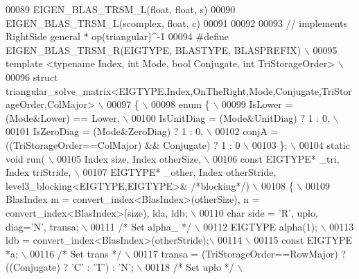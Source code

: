 \begin{DoxyCode}
00089 EIGEN\_BLAS\_TRSM\_L(\textcolor{keywordtype}{float},    \textcolor{keywordtype}{float},  s)
00090 EIGEN\_BLAS\_TRSM\_L(scomplex, \textcolor{keywordtype}{float},  c)
00091 
00092 
00093 \textcolor{comment}{// implements RightSide general * op(triangular)^-1}
00094 \textcolor{preprocessor}{#define EIGEN\_BLAS\_TRSM\_R(EIGTYPE, BLASTYPE, BLASPREFIX) \(\backslash\)}
00095 \textcolor{preprocessor}{template <typename Index, int Mode, bool Conjugate, int TriStorageOrder> \(\backslash\)}
00096 \textcolor{preprocessor}{struct triangular\_solve\_matrix<EIGTYPE,Index,OnTheRight,Mode,Conjugate,TriStorageOrder,ColMajor> \(\backslash\)}
00097 \textcolor{preprocessor}{\{ \(\backslash\)}
00098 \textcolor{preprocessor}{  enum \{ \(\backslash\)}
00099 \textcolor{preprocessor}{    IsLower = (Mode&Lower) == Lower, \(\backslash\)}
00100 \textcolor{preprocessor}{    IsUnitDiag  = (Mode&UnitDiag) ? 1 : 0, \(\backslash\)}
00101 \textcolor{preprocessor}{    IsZeroDiag  = (Mode&ZeroDiag) ? 1 : 0, \(\backslash\)}
00102 \textcolor{preprocessor}{    conjA = ((TriStorageOrder==ColMajor) && Conjugate) ? 1 : 0 \(\backslash\)}
00103 \textcolor{preprocessor}{  \}; \(\backslash\)}
00104 \textcolor{preprocessor}{  static void run( \(\backslash\)}
00105 \textcolor{preprocessor}{      Index size, Index otherSize, \(\backslash\)}
00106 \textcolor{preprocessor}{      const EIGTYPE* \_tri, Index triStride, \(\backslash\)}
00107 \textcolor{preprocessor}{      EIGTYPE* \_other, Index otherStride, level3\_blocking<EIGTYPE,EIGTYPE>& }\textcolor{comment}{/*blocking*/}\textcolor{preprocessor}{) \(\backslash\)}
00108 \textcolor{preprocessor}{  \{ \(\backslash\)}
00109 \textcolor{preprocessor}{   BlasIndex m = convert\_index<BlasIndex>(otherSize), n = convert\_index<BlasIndex>(size), lda, ldb; \(\backslash\)}
00110 \textcolor{preprocessor}{   char side = 'R', uplo, diag='N', transa; \(\backslash\)}
00111 \textcolor{preprocessor}{   }\textcolor{comment}{/* Set alpha\_ */}\textcolor{preprocessor}{ \(\backslash\)}
00112 \textcolor{preprocessor}{   EIGTYPE alpha(1); \(\backslash\)}
00113 \textcolor{preprocessor}{   ldb = convert\_index<BlasIndex>(otherStride);\(\backslash\)}
00114 \textcolor{preprocessor}{\(\backslash\)}
00115 \textcolor{preprocessor}{   const EIGTYPE *a; \(\backslash\)}
00116 \textcolor{preprocessor}{}\textcolor{comment}{/* Set trans */}\textcolor{preprocessor}{ \(\backslash\)}
00117 \textcolor{preprocessor}{   transa = (TriStorageOrder==RowMajor) ? ((Conjugate) ? 'C' : 'T') : 'N'; \(\backslash\)}
00118 \textcolor{preprocessor}{}\textcolor{comment}{/* Set uplo */}\textcolor{preprocessor}{ \(\backslash\)}

\end{DoxyCode}
